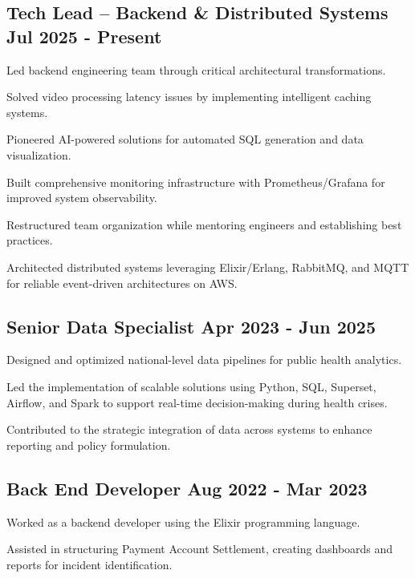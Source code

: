 \documentclass[letter,10pt]{article}
\begin{document}
\subsection{{Tech Lead – Backend \& Distributed Systems \hfill Jul 2025 - Present}}
\begin{zitemize}
\item Led backend engineering team through critical architectural transformations. 
\item Solved video processing latency issues by implementing intelligent caching systems.
\item Pioneered AI-powered solutions for automated SQL generation and data visualization.
\item Built comprehensive monitoring infrastructure with Prometheus/Grafana for improved system observability.
\item Restructured team organization while mentoring engineers and establishing best practices.
\item Architected distributed systems leveraging Elixir/Erlang, RabbitMQ, and MQTT for reliable event-driven architectures on AWS.
\end{zitemize}

\subsection{{Senior Data Specialist \hfill Apr 2023 - Jun 2025}}
\begin{zitemize}
\item Designed and optimized national-level data pipelines for public health analytics.
\item Led the implementation of scalable solutions using Python, SQL, Superset, Airflow, and Spark to support real-time decision-making during health crises.
\item Contributed to the strategic integration of data across systems to enhance reporting and policy formulation.
\end{zitemize}

\subsection{{Back End Developer \hfill Aug 2022 - Mar 2023}}
\begin{zitemize}
\item Worked as a backend developer using the Elixir programming language.
\item Assisted in structuring Payment Account Settlement, creating dashboards and reports for incident identification.
\end{zitemize}
\end{document}
